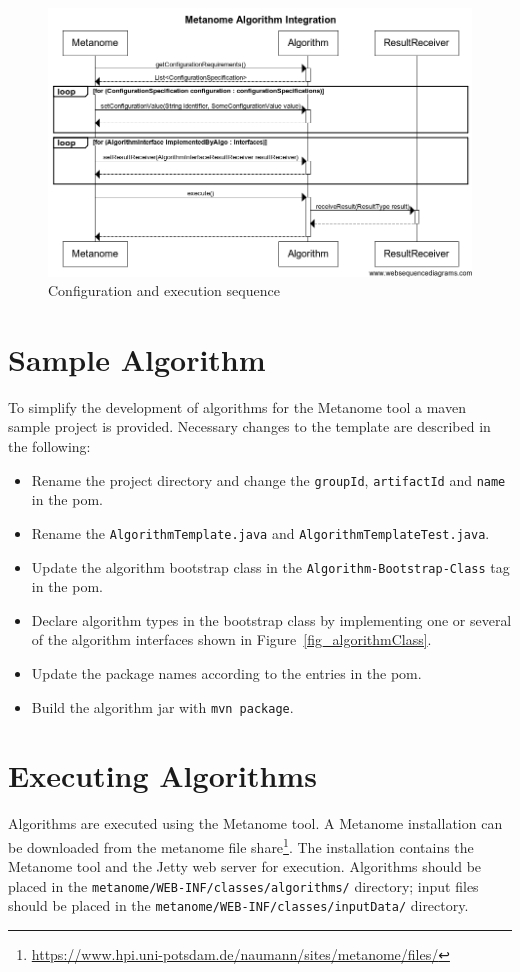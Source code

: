 \documentclass[10pt,a4paper]{article}
\begin{document}
\begin{figure}[h]
\includegraphics[width=\textwidth]{algorithm_sequence}
\caption{Configuration and execution sequence}
\label{fig_integrationSequence}
\end{figure}

\section{Sample Algorithm}
\label{sec_sampleAlgorithm}

To simplify the development of algorithms for the Metanome tool a maven sample project is provided. Necessary changes to the template are described in the following:

\begin{itemize}
\item Rename the project directory and change the \texttt{groupId}, \texttt{artifactId} and \texttt{name} in the pom.
\item Rename the \texttt{AlgorithmTemplate.java} and \texttt{AlgorithmTemplateTest.java}.
\item Update the algorithm bootstrap class in the \texttt{Algorithm-Bootstrap-Class} tag in the pom.
\item Declare algorithm types in the bootstrap class by implementing one or several of the algorithm interfaces shown in Figure~\ref{fig_algorithmClass}. 
\item Update the package names according to the entries in the pom.
\item Build the algorithm jar with \texttt{mvn package}.
\end{itemize}

\section{Executing Algorithms}
\label{sec_executingAlgortithms}

Algorithms are executed using the Metanome tool. A Metanome installation can be downloaded from the metanome file share\footnote{\url{https://www.hpi.uni-potsdam.de/naumann/sites/metanome/files/}}. The installation contains the Metanome tool and the Jetty web server for execution. Algorithms should be placed in the \texttt{metanome/WEB-INF/classes/algorithms/} directory; input files should be placed in the \texttt{metanome/WEB-INF/classes/inputData/} directory.
\end{document}
